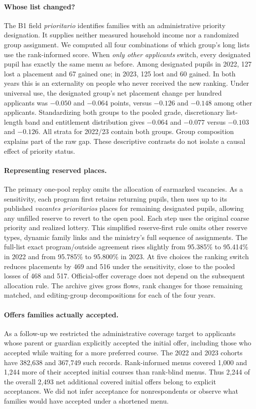 \paragraph{Whose list changed?}
The B1 field \textit{prioritario} identifies families with an administrative priority designation. It supplies neither measured household income nor a randomized group assignment. We computed all four combinations of which group's long lists use the rank-informed score. When \emph{only other applicants} switch, every designated pupil has exactly the same menu as before. Among designated pupils in 2022, 127 lost a placement and 67 gained one; in 2023, 125 lost and 60 gained. In both years this is an externality on people who never received the new ranking. Under universal use, the designated group's net placement change per hundred applicants was $-0.050$ and $-0.064$ points, versus $-0.126$ and $-0.148$ among other applicants. Standardizing both groups to the pooled grade, discretionary list-length band and entitlement distribution gives $-0.064$ and $-0.077$ versus $-0.103$ and $-0.126$. All strata for 2022/23 contain both groups. Group composition explains part of the raw gap. These descriptive contrasts do not isolate a causal effect of priority status.

\paragraph{Representing reserved places.}
The primary one-pool replay omits the allocation of earmarked vacancies. As a sensitivity, each program first retains returning pupils, then uses up to its published \textit{vacantes prioritarios} places for remaining designated pupils, allowing any unfilled reserve to revert to the open pool. Each step uses the original coarse priority and realized lottery. This simplified reserve-first rule omits other reserve types, dynamic family links and the ministry's full sequence of assignments. The full-list exact program/outside agreement rises slightly from 95.385\% to 95.414\% in 2022 and from 95.785\% to 95.800\% in 2023. At five choices the ranking switch reduces placements by 469 and 516 under the sensitivity, close to the pooled losses of 468 and 517. Official-offer coverage does not depend on the subsequent allocation rule. The archive gives gross flows, rank changes for those remaining matched, and editing-group decompositions for each of the four years.

\paragraph{Offers families actually accepted.}
As a follow-up we restricted the administrative coverage target to applicants whose parent or guardian explicitly accepted the initial offer, including those who accepted while waiting for a more preferred course. The 2022 and 2023 cohorts have 382,638 and 367,749 such records. Rank-informed menus covered 1,000 and 1,244 more of their accepted initial courses than rank-blind menus. Thus 2,244 of the overall 2,493 net additional covered initial offers belong to explicit acceptances. We did not infer acceptance for nonrespondents or observe what families would have accepted under a shortened menu.
